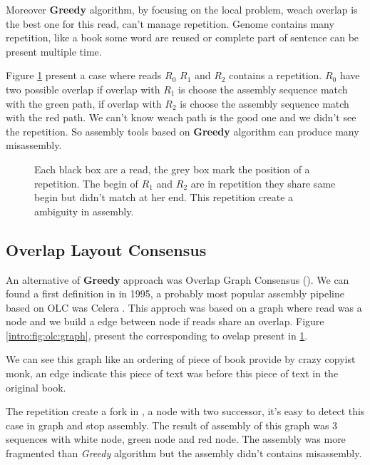 \documentclass[./main.tex]{subfiles}
\begin{document}
Moreover \textbf{Greedy} algorithm, by focusing on the local problem, weach overlap is the best one for this read, can't manage repetition. Genome contains many repetition, like a book some word are reused or complete part of sentence can be present multiple time.

Figure \ref{intro:fig:greedy:repetition} present a case where reads $R_0$ $R_1$ and $R_2$ contains a repetition. $R_0$ have two possible overlap if overlap with $R_1$ is choose the assembly sequence match with the green path, if overlap with $R_2$ is choose the assembly sequence match with the red path. We can't know weach path is the good one and we didn't see the repetition. So assembly tools based on \textbf{Greedy} algorithm can produce many misassembly. 

\begin{figure}[ht]
    \centering 
    
    \caption{Each black box are a read, the grey box mark the position of a repetition. The begin of $R_1$ and $R_2$ are in repetition they share same begin but didn't match at her end. This repetition create a ambiguity in assembly.}
    \label{intro:fig:greedy:repetition}
\end{figure}

\subsection{Overlap Layout Consensus}

An alternative of \textbf{Greedy} approach was Overlap Graph Consensus (\OLC). We can found a first \OLC definition in \cite{OLC_myers} in 1995, a probably most popular assembly pipeline based on OLC was Celera \cite{celera_first, celera_second}. This approch was based on a graph where read was a node and we build a edge between node if reads share an overlap. Figure \ref{intro:fig:olc:graph}, present the \OLC corresponding to ovelap present in \ref{intro:fig:greedy:repetition}.

We can see this graph like an ordering of piece of book provide by crazy copyist monk, an edge indicate this piece of text was before this piece of text in the original book.

The repetition create a fork in \OLC, a node with two successor, it's easy to detect this case in graph and stop assembly. The result of assembly of this graph was 3 sequences with white node, green node and red node. The assembly was more fragmented than \textit{Greedy} algorithm but the assembly didn't contains misassembly.
\end{document}
